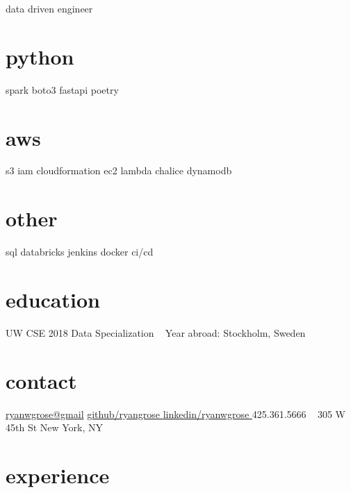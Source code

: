 \documentclass[]{friggeri-cv}
\begin{document}
       {data driven engineer}


\begin{aside}
  \section{python}
    spark
    boto3
    fastapi
    poetry
  \section{aws}
    s3
    iam
    cloudformation
    ec2
    lambda
    chalice
    dynamodb
  \section{other}
    sql
    databricks
    jenkins
    docker
    ci/cd
  \section{education}
    UW CSE 2018
    Data Specialization
    ~
    Year abroad:
    Stockholm, Sweden
  \section{contact}
    \href{mailto:ryanwgrose@gmail.com}{ryanwgrose@gmail\faEnvelope}
    \href{https://www.github.com/ryangrose}{github/ryangrose \faGithub}
    \href{https://www.linkedin.com/in/ryanwgrose}{linkedin/ryanwgrose \faLinkedin}
    425.361.5666 \faPhone
    ~
    305 W 45th St
    New York, NY
\end{aside}

\section{experience}
\end{document}
